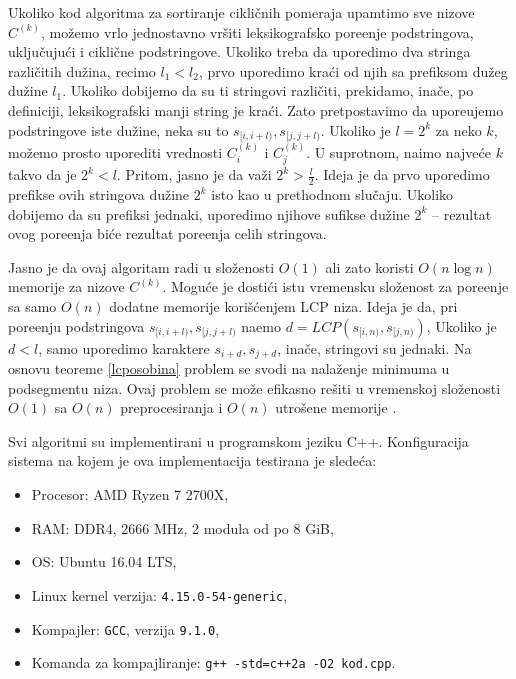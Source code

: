 
Ukoliko kod algoritma za sortiranje cikli\v cnih pomeraja upamtimo sve nizove $C^{(k)}$, mo\v zemo vrlo jednostavno vr\v siti leksikografsko pore\dj enje podstringova, uklju\v cuju\' ci i cikli\v cne podstringove. Ukoliko treba da uporedimo dva stringa razli\v citih du\v zina, recimo $l_1 < l_2$, prvo uporedimo kra\' ci od njih sa prefiksom du\v zeg du\v zine $l_1$. Ukoliko dobijemo da su ti stringovi razli\v citi, prekidamo, ina\v ce, po definiciji, leksikografski manji string je kra\' ci. Zato pretpostavimo da upore\dj ujemo podstringove iste du\v zine, neka su to $s_{[i, i+l)}, s_{[j, j+l)}$.  Ukoliko je $l = 2^k$ za neko $k$, mo\v zemo prosto uporediti vrednosti $C^{(k)}_i$ i $C^{(k)}_j$. U suprotnom, na\dj imo najve\' ce $k$ takvo da je $2^k < l$. Pritom, jasno je da va\v zi $2^k > \frac{l}{2}$. Ideja je da prvo uporedimo prefikse ovih stringova du\v zine $2^k$ isto kao u prethodnom slu\v caju. Ukoliko dobijemo da su prefiksi jednaki, uporedimo njihove sufikse du\v zine $2^k$ -- rezultat ovog pore\dj enja bi\' ce rezultat pore\dj enja celih stringova.

Jasno je da ovaj algoritam radi u slo\v zenosti $O(1)$ ali zato koristi $O(n \log n)$ memorije za nizove $C^{(k)}$. Mogu\' ce je dosti\' ci istu vremensku slo\v zenost za pore\dj enje sa samo $O(n)$ dodatne memorije kori\v s\' cenjem LCP niza. Ideja je da, pri pore\dj enju podstringova $s_{[i, i+l)}, s_{[j, j+l)}$ na\dj emo $d = LCP(s_{[i, n)}, s_{[j, n)})$, Ukoliko je $d < l$, samo uporedimo karaktere $s_{i+d}, s_{j+d}$, ina\v ce, stringovi su jednaki. Na osnovu teoreme \ref{lcposobina} problem se svodi na nala\v zenje minimuma u podsegmentu niza. Ovaj problem se mo\v ze efikasno re\v siti u vremenskoj slo\v zenosti $O(1)$ sa $O(n)$ preprocesiranja i $O(n)$ utro\v sene memorije \cite{lcarmq}.



Svi algoritmi su implementirani u programskom jeziku C++. Konfiguracija sistema na kojem je ova implementacija testirana je slede\' ca:

\begin{itemize}
    \item Procesor: AMD Ryzen 7 2700X,
    \item RAM: DDR4, 2666 MHz, 2 modula od po 8 GiB,
    \item OS: Ubuntu 16.04 LTS,
    \item Linux kernel verzija: \texttt{4.15.0-54-generic},
    \item Kompajler: \texttt{GCC}, verzija \texttt{9.1.0},
    \item Komanda za kompajliranje: \texttt{g++ -std=c++2a -O2 kod.cpp}.
\end{itemize}

